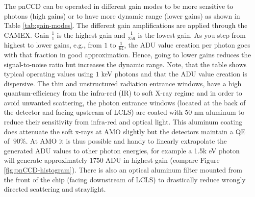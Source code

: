 The pnCCD can be operated in different gain modes to be more sensitive to photons (high gains) or to have more dynamic range (lower gains) as shown in Table \ref{tab:gain-modes}. The different gain amplifications are applied through the CAMEX. Gain $\frac{1}{1}$ is the highest gain and $\frac{1}{256}$ is the lowest gain. As you step from highest to lower gains, e.g., from $1$ to $\frac{1}{64}$, the ADU value creation per photon goes with that fraction in good approximation. Hence, going to lower gains reduces the signal-to-noise ratio but increases the dynamic range. Note, that the table shows typical operating values using $1$ keV photons and that the ADU value creation is dispersive. The thin and unstructured radiation entrance windows, have a high quantum-efficiency from the infra-red (IR) to soft X-ray regime and in order to avoid unwanted scattering, the photon entrance windows (located at the back of the detector and facing upstream of LCLS) are coated with 50 nm aluminum to reduce their sensitivity from infra-red and optical light. This aluminum coating does attenuate the soft x-rays at AMO slightly but the detectors maintain a QE of $~90\%$. At AMO it is thus possible and handy to linearly extrapolate the generated ADU values to other photon energies, for example a 1.5k eV photon will generate approximately 1750 ADU in highest gain (compare Figure \ref{fig:pnCCD-histogram}). There is also an optical aluminum filter mounted from the front of the chip (facing downstream of LCLS) to drastically reduce wrongly directed scattering and straylight.
%
%
%

